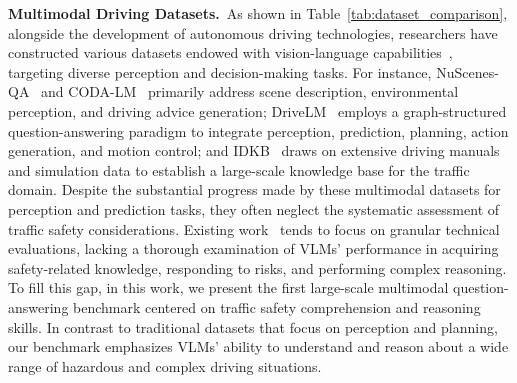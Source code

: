 \documentclass[sigconf]{acmart}
\begin{document}
\noindent\textbf{Multimodal Driving Datasets.}~As shown in Table~\ref{tab:dataset_comparison}, alongside the development of autonomous driving technologies, researchers have constructed various datasets endowed with vision-language capabilities~\cite{deruyttere2019talk2car,park2024vlaad}, targeting diverse perception and decision-making tasks. For instance, NuScenes-QA~\cite{qian2024nuscenes} and CODA-LM~\cite{chen2024automated} primarily address scene description, environmental perception, and driving advice generation; DriveLM~\cite{sima2025drivelm} employs a graph-structured question-answering paradigm to integrate perception, prediction, planning, action generation, and motion control; and IDKB~\cite{lu2024lvlms}  draws on extensive driving manuals and simulation data to establish a large-scale knowledge base for the traffic domain. Despite the substantial progress made by these multimodal datasets for perception and prediction tasks, they often neglect the systematic assessment of traffic safety considerations. Existing work~\cite{Xu_2020_CVPR,malla2023drama,9052709, tian2024drivevlm,xu2024drivegpt4,lv2023disentangled,9351755} tends to focus on granular technical evaluations, lacking a thorough examination of VLMs’ performance in acquiring safety-related knowledge, responding to risks, and performing complex reasoning. To fill this gap, in this work, we present the first large-scale multimodal question-answering benchmark centered on traffic safety comprehension and reasoning skills. In contrast to traditional datasets that focus on perception and planning, our benchmark emphasizes VLMs' ability to understand and reason about a wide range of hazardous and complex driving situations.%
\end{document}
